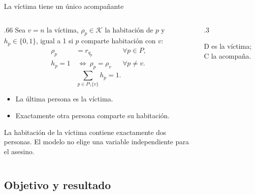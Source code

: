 \documentclass[aspectratio=169,11pt]{beamer}
\newcommand{\examplegrid}{%
  \draw[step=1,ink!35] (0,0) grid (4,4);
  \draw[ink,thick] (0,0) rectangle (4,4);
}
\begin{document}
\begin{frame}{La v\'ictima tiene un \'unico acompa\~nante}
  \begin{columns}[T,onlytextwidth]
  \begin{column}{.66\textwidth}
  \small
  Sea \(v=n\) la v\'ictima, \(\rho_p\in\mathcal K\) la habitaci\'on de \(p\)
  y \(h_p\in\{0,1\}\), igual a 1 si \(p\) comparte habitaci\'on con \(v\):
  \[
    \begin{aligned}
      \rho_p&=r_{q_p} &&\forall p\in P,\\
      h_p=1&\ \Longleftrightarrow\ \rho_p=\rho_v &&\forall p\ne v.
    \end{aligned}
  \]
  \[
    \sum_{p\in P\setminus\{v\}}h_p=1.
  \]
  \begin{itemize}
    \setlength{\itemsep}{2mm}
    \item La \'ultima persona es la v\'ictima.
    \item Exactamente otra persona comparte su habitaci\'on.
  \end{itemize}
  \small La habitaci\'on de la v\'ictima contiene exactamente dos personas.
  El modelo no elige una variable independiente para el asesino.
  \end{column}
  \begin{column}{.3\textwidth}
    \centering
    \par\smallskip\scriptsize D es la v\'ictima; C la acompa\~na.
  \end{column}
  \end{columns}
\end{frame}

\subsection{Objetivo y resultado}
\end{document}
